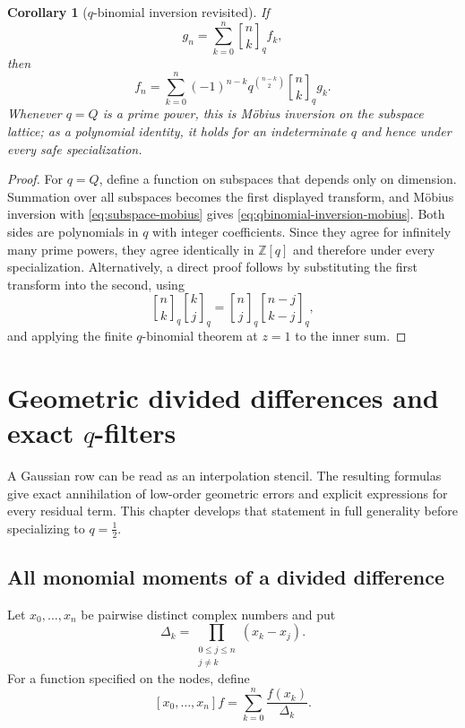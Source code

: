 \documentclass[11pt,oneside,openany]{book}
\newtheorem{corollary}[theorem]{Corollary}
\theoremstyle{definition}
\theoremstyle{remark}
\newcommand{\qbinom}[2]{\genfrac{[}{]}{0pt}{}{#1}{#2}_{q}}
\newcommand{\Qbinom}[3]{\genfrac{[}{]}{0pt}{}{#1}{#2}_{#3}}
\newcommand{\Z}{\mathbb Z}
\begin{document}
\begin{corollary}[$q$-binomial inversion revisited]\label{cor:qbinomial-inversion-mobius}
If
\[
 g_n=\sum_{k=0}^n\qbinom nk f_k,
\]
then
\begin{equation}
 f_n=\sum_{k=0}^n(-1)^{n-k}q^{\binom{n-k}{2}}\qbinom nk g_k.\label{eq:qbinomial-inversion-mobius}
\end{equation}
Whenever $q=Q$ is a prime power, this is M\"obius inversion on the subspace lattice; as a polynomial identity, it holds for an indeterminate $q$ and hence under every safe specialization.
\end{corollary}

\begin{proof}
For $q=Q$, define a function on subspaces that depends only on dimension.  Summation over all subspaces becomes the first displayed transform, and M\"obius inversion with \eqref{eq:subspace-mobius} gives \eqref{eq:qbinomial-inversion-mobius}.  Both sides are polynomials in $q$ with integer coefficients.  Since they agree for infinitely many prime powers, they agree identically in $\Z[q]$ and therefore under every specialization.  Alternatively, a direct proof follows by substituting the first transform into the second, using
\[
 \qbinom nk\qbinom kj=\qbinom nj\Qbinom{n-j}{k-j}q,
\]
and applying the finite $q$-binomial theorem at $z=1$ to the inner sum.
\end{proof}


\chapter{Geometric divided differences and exact \texorpdfstring{$q$}{q}-filters}\label{chap:qfilters}

A Gaussian row can be read as an interpolation stencil.  The resulting formulas give exact annihilation of low-order geometric errors and explicit expressions for every residual term.  This chapter develops that statement in full generality before specializing to $q=\tfrac12$.

\section{All monomial moments of a divided difference}

Let $x_0,\ldots,x_n$ be pairwise distinct complex numbers and put
\[
 \Delta_k=\prod_{\substack{0\le j\le n\\j\ne k}}(x_k-x_j).
\]
For a function specified on the nodes, define
\[
 [x_0,\ldots,x_n]f=\sum_{k=0}^n\frac{f(x_k)}{\Delta_k}.
\]
\end{document}
